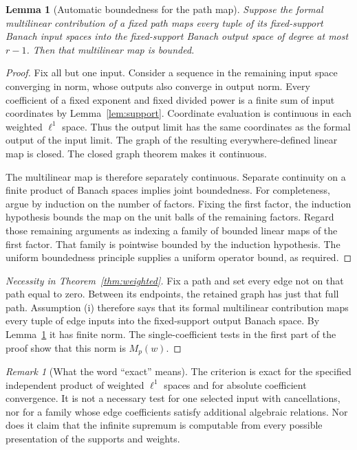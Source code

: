 \documentclass[11pt,a4paper]{article}
\numberwithin{equation}{section}
\newtheorem{lemma}[theorem]{Lemma}
\theoremstyle{definition}
\theoremstyle{remark}
\newtheorem{remark}[theorem]{Remark}
\begin{document}
\begin{lemma}[Automatic boundedness for the path map]\label{lem:closedgraph}
Suppose the formal multilinear contribution of a fixed path maps every
tuple of its fixed-support Banach input spaces into the fixed-support
Banach output space of degree at most $r-1$. Then that multilinear map is
bounded.
\end{lemma}
\begin{proof}
Fix all but one input. Consider a sequence in the remaining input space
converging in norm, whose outputs also converge in output norm. Every
coefficient of a fixed exponent and fixed divided power is a finite sum
of input coordinates by Lemma~\ref{lem:support}. Coordinate evaluation is
continuous in each weighted $\ell^1$ space. Thus the output limit has the
same coordinates as the formal output of the input limit. The graph of
the resulting everywhere-defined linear map is closed. The closed graph
theorem makes it continuous.

The multilinear map is therefore separately continuous. Separate
continuity on a finite product of Banach spaces implies joint boundedness.
For completeness, argue by induction on the number of factors. Fixing the
first factor, the induction hypothesis bounds the map on the unit balls
of the remaining factors. Regard those remaining arguments as indexing a
family of bounded linear maps of the first factor. That family is
pointwise bounded by the induction hypothesis. The uniform boundedness
principle supplies a uniform operator bound, as required.
\end{proof}

\begin{proof}[Necessity in Theorem~\ref{thm:weighted}]
Fix a path and set every edge not on that path equal to zero. Between its
endpoints, the retained graph has just that full path. Assumption (i)
therefore says that its formal multilinear contribution maps every tuple
of edge inputs into the fixed-support output Banach space. By
Lemma~\ref{lem:closedgraph} it has finite norm. The single-coefficient tests
in the first part of the proof show that this norm is $M_p(w)$.
\end{proof}

\begin{remark}[What the word ``exact'' means]
The criterion is exact for the specified independent product of weighted
$\ell^1$ spaces and for absolute coefficient convergence. It is not a
necessary test for one selected input with cancellations, nor for a family
whose edge coefficients satisfy additional algebraic relations. Nor does it
claim that the infinite supremum is computable from every possible
presentation of the supports and weights.
\end{remark}
\end{document}
